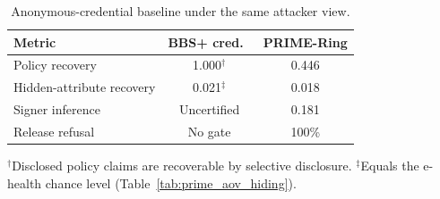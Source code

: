 \begin{table}[htbp]
\centering
\caption{Anonymous-credential baseline under the same attacker view.}
\label{tab:bbs-baseline}
\scriptsize
\setlength{\tabcolsep}{4pt}
\renewcommand{\arraystretch}{1.05}
\begin{tabular}{lcc}
\toprule
Metric & BBS+ cred.~\cite{flamini2024selective,w3c2025bbs} & PRIME-Ring \\
\midrule
Policy recovery & 1.000$^{\dagger}$ & 0.446 \\
Hidden-attribute recovery & 0.021$^{\ddagger}$ & 0.018 \\
Signer inference & Uncertified & 0.181 \\
Release refusal & No gate & 100\% \\
\bottomrule
\end{tabular}

\vspace{2pt}
\begin{minipage}{0.95\columnwidth}
\scriptsize
$^{\dagger}$Disclosed policy claims are recoverable by selective disclosure. $^{\ddagger}$Equals the e-health chance level (Table~\ref{tab:prime_aov_hiding}).
\end{minipage}
\end{table}
